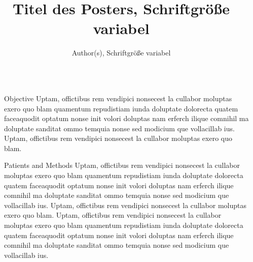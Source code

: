\documentclass[final]{beamer}
\title{Titel des Posters, Schriftgröße variabel} %
\author{Author(s), Schriftgröße variabel} %
\institute{Department, Wirtschaftsuniversität Wien
, Schriftgröße variabel} %
\newlength{\sepmargin}
\newlength{\onecolwid}
\begin{document}
  \setlength{\belowcaptionskip}{2ex} %
  \setlength\belowdisplayshortskip{1ex} %
  
  
  \begin{frame}[t] %

      \begin{columns}[t] %
	  
      \begin{column}{\sepmargin}\end{column}
      
	    \begin{column}{\onecolwid} %


		  \begin{block}{Objective}
          Uptam, offictibus rem vendipici nonsecest la cullabor moluptas exero quo blam quamentum repudistiam iunda doluptate dolorecta quatem faceaquodit optatum nonse init volori doluptas nam erferch ilique comnihil ma doluptate sanditat ommo temquia nonse sed modicium que vollacillab ius. Uptam, offictibus rem vendipici nonsecest la cullabor moluptas exero quo blam.
          \end{block}
          
          \begin{block}{Patients and Methods}
          Uptam, offictibus rem vendipici nonsecest la cullabor moluptas exero quo blam quamentum repudistiam iunda doluptate dolorecta quatem faceaquodit optatum nonse init volori doluptas nam erferch ilique comnihil ma doluptate sanditat ommo temquia nonse sed modicium que vollacillab ius. Uptam, offictibus rem vendipici nonsecest la cullabor moluptas exero quo blam.
Uptam, offictibus rem vendipici nonsecest la cullabor moluptas exero quo blam quamentum repudistiam iunda doluptate dolorecta quatem faceaquodit optatum nonse init volori doluptas nam erferch ilique comnihil ma doluptate sanditat ommo temquia nonse sed modicium que vollacillab ius.
          \end{block}
          

\end{column}
\end{columns}
\end{frame}
\end{document}
